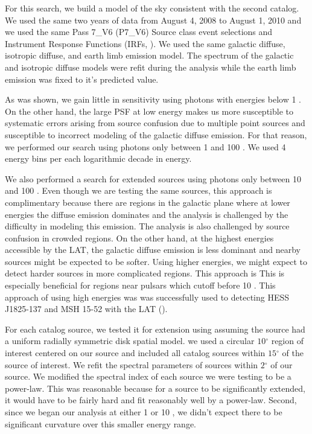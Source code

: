 \documentclass[12pt,preprint]{aastex}
\newcommand{\gev}{\text{GeV}\xspace}
\renewcommand{\deg}{\ensuremath{^\circ}\xspace}
\newcommand{\pointlike}{\text{\em pointlike}\xspace}
\begin{document}
For this search, we build a model of the
sky consistent with the second catalog.   We used the same two
years of data from August 4, 2008 to August 1, 2010 and we used the same
Pass 7\_V6 (P7\_V6) Source class event selections and 
Instrument Response Functions (IRFs, \cite{lat_on_orbit_psf}).  We used the same galactic diffuse,
isotropic diffuse, and earth limb emission model. The spectrum of the
galactic and isotropic diffuse models were refit during the analysis
while the earth limb emission was fixed to it's predicted value.

As was shown, we gain little in sensitivity using photons with energies
below 1 \gev. On the other hand, the large PSF at low energy makes us
more susceptible to systematic errors arising from source confusion due
to multiple point sources and susceptible to incorrect modeling of the
galactic diffuse emission.  For that reason, we performed our search
using photons only between 1 \gev and 100 \gev.
We used 4 energy bins per each logarithmic decade in energy.

We also performed a search for extended sources using photons only between
10 \gev and 100 \gev. Even though we are testing the same sources, this
approach is complimentary because there are regions in the galactic
plane where at lower energies the diffuse emission dominates and the
analysis is challenged by the difficulty in modeling this emission.
The analysis is also challenged by source confusion in crowded regions.
On the other hand, at the highest energies accessible by the LAT, the
galactic diffuse emission is less dominant and nearby sources might
be expected to be softer.  Using higher energies, we might expect
to detect harder sources in more complicated regions. This approach
is This is especially beneficial for regions near pulsars which
cutoff before 10 \gev.  This approach of using high energies was was
successfully used to detecting HESS J1825-137 and MSH 15-52 with the LAT
(\cite{msh1552,fermi_hess_j1825}).

For each catalog source, we tested it for extension using \pointlike
assuming the source had a uniform radially symmetric disk spatial model.
we used a circular $10\deg$ region of interest centered on our source and
included all catalog sources within $15\deg$ of the source of interest.
We refit the spectral parameters of sources within $2\deg$ of our source.
We modified the spectral index of each source we were testing to be a
power-law. This was reasonable because for a source to be significantly
extended, it would have to be fairly hard and fit reasonably well by
a power-law. Second, since we began our analysis at either 1 \gev or
10 \gev, we didn't expect there to be significant curvature over this
smaller energy range.
\end{document}
